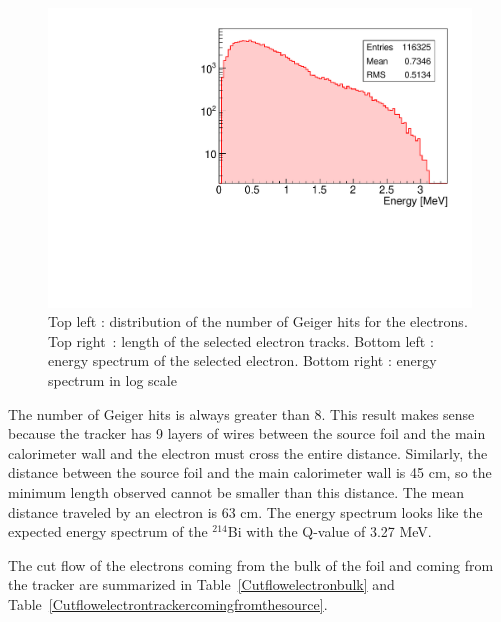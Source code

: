 \documentclass[main.tex]{subfiles}
\begin{document}
\begin{figure}[h!]
\begin{center}
\includegraphics[scale=0.32]{pictures/Chap5/source_selection_surface_energy_log.pdf}
\caption{Top left : distribution of the number of Geiger hits for the electrons. Top right~: length of the selected electron tracks. Bottom left : energy spectrum of the selected electron. Bottom right : energy spectrum in log scale}
\label{electron_gghit_length_time_energy_sss}
\end{center}
\end{figure}


\bigskip


\noindent The number of Geiger hits is always greater than 8. This result makes sense because the tracker has 9 layers of wires between the source foil and the main calorimeter wall and the electron must cross the entire distance. Similarly, the distance between the source foil and the main calorimeter wall is 45 cm, so the minimum length observed cannot be smaller than this distance. The mean distance traveled by an electron is 63 cm. The energy spectrum looks like the expected energy spectrum of the  $^{\text{214}}$Bi with the Q-value of 3.27 MeV.


\bigskip


\noindent The cut flow of the electrons coming from the bulk of the foil and coming from the tracker are summarized in Table~\ref{Cutflowelectronbulk} and Table~\ref{Cutflowelectrontrackercomingfromthesource}.
\end{document}
